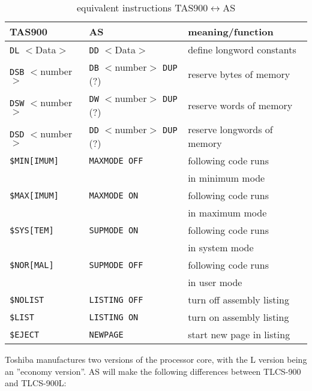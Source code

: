 \documentclass[12pt,twoside]{report}
\newcommand{\tty}[1]{{\tt #1}}
\begin{document}
\begin{table*}[htbp]   
\begin{center}\begin{tabular}{|l|l|l|}
\hline
TAS900           & AS                  &     meaning/function \\
\hline
\hline
\tty{DL} $<$Data$>$    & \tty{DD} $<$Data$>$           & define longword constants \\
\hline
\tty{DSB} $<$number$>$ & \tty{DB} $<$number$>$ \tty{DUP} (?) & reserve bytes of memory \\
\hline
\tty{DSW} $<$number$>$ & \tty{DW} $<$number$>$ \tty{DUP} (?) & reserve words of memory \\
\hline
\tty{DSD} $<$number$>$ & \tty{DD} $<$number$>$ \tty{DUP} (?) & reserve longwords of memory \\
\hline
\tty{\$MIN[IMUM]}      & \tty{MAXMODE OFF}             & following code runs \\
                       &                               & in minimum mode \\
\hline
\tty{\$MAX[IMUM]}      & \tty{MAXMODE ON}              & following code runs \\
                       &                               & in maximum mode \\
\hline
\tty{\$SYS[TEM]}       & \tty{SUPMODE ON}              & following code runs \\
                       &                               & in system mode \\
\hline
\tty{\$NOR[MAL]}       & \tty{SUPMODE OFF}             & following code runs \\
                       &                               & in user mode \\
\hline
\tty{\$NOLIST}         & \tty{LISTING OFF}             & turn off assembly listing \\
\hline
\tty{\$LIST}           & \tty{LISTING ON}              & turn on assembly listing \\
\hline
\tty{\$EJECT}          & \tty{NEWPAGE}                 & start new page in listing \\
\hline
\end{tabular}\end{center}
\caption{equivalent instructions TAS900$\leftrightarrow$AS\label{TabTAS900}}
\end{table*}
Toshiba manufactures two versions of the processor core, with the L
version being an ''economy version''.  AS will make the following
differences between TLCS-900 and TLCS-900L:
\end{document}
